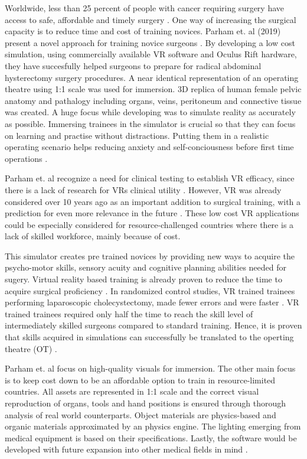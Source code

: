 Worldwide, less than 25 percent of people with cancer requiring surgery have access to safe, affordable and timely surgery \cite{RN52}.
One way of increasing the surgical capacity is to reduce time and cost of training novices.
Parham et. al (2019) present a novel approach for training novice surgeons \cite{RN52}.
By developing a low cost simulation, using commercially available VR software and Oculus Rift hardware, they have succesfully 
helped surgeons to prepare for radical abdominal hysterectomy surgery procedures.
A near identical representation of an operating theatre using 1:1 scale was used for immersion.
3D replica of human female pelvic anatomy and pathalogy including organs, veins, peritoneum and connective tissue was created.
A huge focus while developing was to simulate reality as accurately as possible. 
Immersing trainees in the simulator is crucial so that they can focus on learning and practise without distractions.
Putting them in a realistic operating scenario helps reducing anxiety and self-conciousness before first time operations \cite{RN52}.

Parham et. al recognize a need for clinical testing to establish VR efficacy, since there is a lack of research for VRs clinical utility \cite{RN59}. 
However, VR was already considered over 10 years ago as an important addition to surgical training, with a prediction for even more relevance in the future \cite{RN60}.
These low cost VR applications could be especially considered for resource-challenged countries where there is a lack of skilled workforce, mainly because of cost.

This simulator creates pre trained novices by providing new ways to acquire the psycho-motor skills, sensory acuity and cognitive planning abilities needed for sugery.
Virtual reality based training is already proven to reduce the time to acquire surgical proficiency \cite{RN61,RN62}. 
In randomized control studies, VR trained trainees performing laparoscopic cholecystectomy, made fewer errors and were faster \cite{RN63,RN64}.
VR trained trainees required only half the time to reach the skill level of intermediately skilled surgeons compared to standard training.
Hence, it is proven that skills acquired in simulations can successfully be translated to the operting theatre (OT) \cite{RN63,RN64}.

Parham et. al focus on high-quality visuals for immersion.
The other main focus is to keep cost down to be an affordable option to train in resource-limited countries.
All assets are represented in 1:1 scale and the correct visual reproduction of organs, tools and hand positions is ensured through thorough analysis of real world counterparts.
Object materials are physics-based and organic materials approximated by an physics engine.
The lighting emerging from medical equipment is based on their specifications.
Lastly, the software would be developed with future expansion into other medical fields in mind \cite{RN52}.

